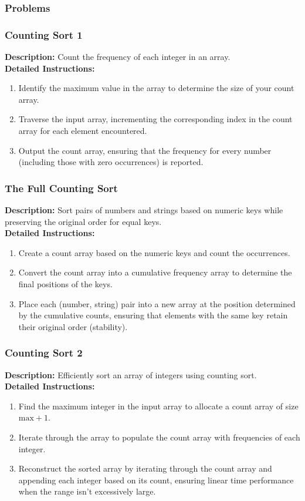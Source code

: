 \subsubsection{Problems}
\subsubsection{Counting Sort 1}
\textbf{Description:} Count the frequency of each integer in an array. \\
\textbf{Detailed Instructions:}
\begin{enumerate}
    \item Identify the maximum value in the array to determine the size of your count array.
    \item Traverse the input array, incrementing the corresponding index in the count array for each element encountered.
    \item Output the count array, ensuring that the frequency for every number (including those with zero occurrences) is reported.
\end{enumerate}

\subsubsection{The Full Counting Sort}
\textbf{Description:} Sort pairs of numbers and strings based on numeric keys while preserving the original order for equal keys. \\
\textbf{Detailed Instructions:}
\begin{enumerate}
    \item Create a count array based on the numeric keys and count the occurrences.
    \item Convert the count array into a cumulative frequency array to determine the final positions of the keys.
    \item Place each (number, string) pair into a new array at the position determined by the cumulative counts, ensuring that elements with the same key retain their original order (stability).
\end{enumerate}

\subsubsection{Counting Sort 2}
\textbf{Description:} Efficiently sort an array of integers using counting sort. \\
\textbf{Detailed Instructions:}
\begin{enumerate}
    \item Find the maximum integer in the input array to allocate a count array of size \(\text{max}+1\).
    \item Iterate through the array to populate the count array with frequencies of each integer.
    \item Reconstruct the sorted array by iterating through the count array and appending each integer based on its count, ensuring linear time performance when the range isn’t excessively large.
\end{enumerate}

